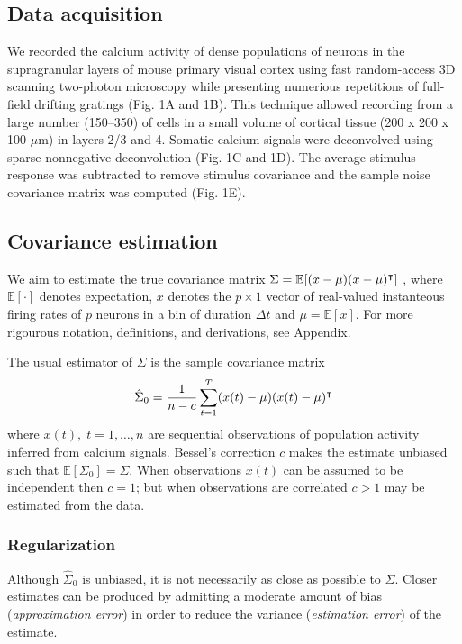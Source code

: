 \subsection*{Data acquisition}
We recorded the calcium activity  of dense populations of neurons in the supragranular layers of mouse primary visual cortex using fast random-access 3D scanning two-photon microscopy \cite{Stosiek:2003,Reddy:2005}   while presenting numerious repetitions of full-field drifting gratings (Fig. 1A and 1B). This technique allowed recording from a large number (150--350) of cells in a small volume of cortical tissue (200 x 200 x 100 $\mu$m) in layers 2/3 and 4. Somatic calcium signals were deconvolved using  sparse nonnegative deconvolution \cite{Vogelstein:2010} (Fig. 1C and 1D).  The average stimulus response was subtracted to remove stimulus covariance and the sample noise covariance matrix was computed (Fig. 1E).

\subsection*{Covariance estimation}
We aim to estimate the true covariance matrix $\Sigma = \mathbb E [(x-\mu)(x-\mu)^\intercal]$ , where $\mathbb E[\cdot]$ denotes expectation, $x$ denotes the $p\times 1$ vector of real-valued instanteous firing rates of $p$ neurons in a bin of duration $\Delta t$ and $\mu = \mathbb E[x]$.  For more rigourous notation, definitions, and derivations, see Appendix. 

The usual estimator of $\Sigma$ is the sample covariance matrix
\begin{equation}
\hat \Sigma_0 = \frac 1 {n-c} \sum\limits_{t=1}^T (x(t)-\mu)(x(t)-\mu)^\intercal 
\end{equation}
where $x(t),\;t=1,\ldots,n$ are sequential observations of population activity inferred from calcium signals. Bessel's correction $c$ makes the estimate unbiased such that $\mathbb E[\Sigma_0] = \Sigma$. When observations $x(t)$ can be assumed to be independent then $c=1$; but when observations are correlated $c>1$ may be estimated from the data. 

\subsubsection*{Regularization}
Although $\hat\Sigma_0$ is unbiased, it is not necessarily as close as possible to $\Sigma$.  Closer estimates can be produced by admitting a moderate amount of bias (\emph{approximation error}) in order to reduce the variance (\emph{estimation error}) of the estimate. 

